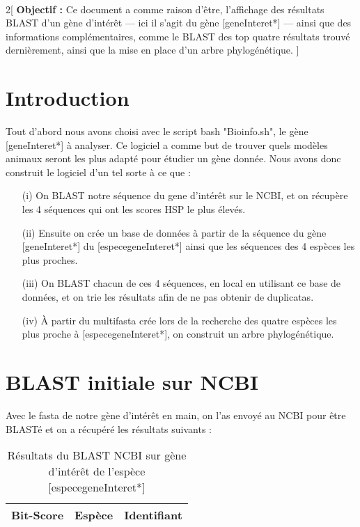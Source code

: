 \documentclass[a4paper]{article}
\begin{document}
\\

\noindent{\Large{\textbf{[NomUtilisateur*]}}}
\vspace*{7mm}


\begin{multicols}{2}[
\noindent\textbf{Objectif : }Ce document a comme raison d'être, l'affichage des résultats BLAST d'un gène d'intérêt — ici il s'agit du gène [geneInteret*] — ainsi que des informations complémentaires, comme le BLAST des top quatre résultats trouvé dernièrement, ainsi que la mise en place d'un arbre phylogénétique.
\vspace*{1mm}]

\section{Introduction}
Tout d'abord nous avons choisi avec le script bash "Bioinfo.sh", le gène [geneInteret*] à analyser. Ce logiciel a comme but de trouver quels modèles animaux seront les plus adapté pour étudier un gène donnée. Nous avons donc construit le logiciel d'un tel sorte à ce que :
\begin{enumerate}
\item[(i)] On BLAST notre séquence du gene d'intérêt sur le NCBI, et on récupère les 4 séquences qui ont les scores HSP le plus élevés.

\item[(ii)] Ensuite on crée un base de données à partir de la séquence du gène [geneInteret*] du [especegeneInteret*] ainsi que les séquences des 4 espèces les plus proches.

\item[(iii)] On BLAST chacun de ces 4 séquences, en local en utilisant ce base de données, et on trie les résultats afin de ne pas obtenir de duplicatas.

\item[(iv)] À partir du multifasta crée lors de la recherche des quatre espèces les plus proche à [especegeneInteret*], on construit un arbre phylogénétique.
\end{enumerate}

\section{BLAST initiale sur NCBI}
Avec le fasta de notre gène d'intérêt en main, on l'as envoyé au NCBI pour être BLASTé et on a récupéré les résultats suivants :
\begin{table}[H]
\small\sf\centering
\caption{Résultats du BLAST NCBI sur gène d'intérêt de l'espèce [especegeneInteret*]}
\begin{tabular}{lll}
\toprule
Bit-Score&Espèce&Identifiant\\
\midrule
[TableaugeneInteret*]
\bottomrule
\end{tabular}\\[10pt]
\end{table}


\end{multicols}
\end{document}
